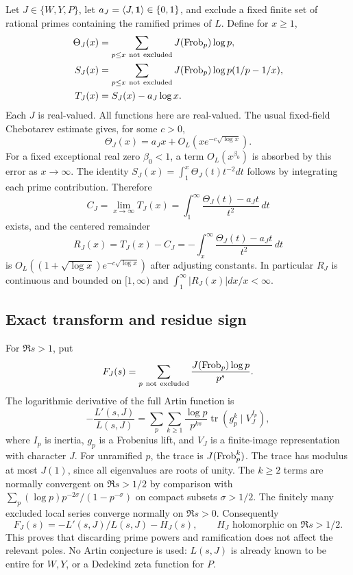 \documentclass[11pt,letterpaper]{article}
\theoremstyle{remark}\newtheorem{remark}[theorem]{Remark}
\begin{document}
Let $J\in\{W,Y,P\}$, let $a_J=\langle J,\mathbf1\rangle\in\{0,1\}$, and exclude a fixed finite set of rational primes containing the ramified primes of $L$. Define for $x\ge1$,
\begin{align*}
 \Theta_J(x)&=\sum_{p\le x\ \mathrm{not\ excluded}}J(\operatorname{Frob}_p)\log p,\\
 S_J(x)&=\sum_{p\le x\ \mathrm{not\ excluded}}J(\operatorname{Frob}_p)\log p(1/p-1/x),\\
 T_J(x)&=S_J(x)-a_J\log x.
\end{align*}
Each $J$ is real-valued. All functions here are real-valued. The usual fixed-field Chebotarev estimate gives, for some $c>0$,
\[
 \Theta_J(x)=a_J x+O_L(xe^{-c\sqrt{\log x}}).
\]
For a fixed exceptional real zero $\beta_0<1$, a term $O_L(x^{\beta_0})$ is absorbed by this error as $x\to\infty$. The identity $S_J(x)=\int_1^x\Theta_J(t)t^{-2}dt$ follows by integrating each prime contribution. Therefore
\[
 C_J=\lim_{x\to\infty}T_J(x)=\int_1^\infty\frac{\Theta_J(t)-a_Jt}{t^2}\,dt
\]
exists, and the centered remainder
\[
 R_J(x)=T_J(x)-C_J=-\int_x^\infty\frac{\Theta_J(t)-a_Jt}{t^2}\,dt
\]
is $O_L((1+\sqrt{\log x})e^{-c\sqrt{\log x}})$ after adjusting constants. In particular $R_J$ is continuous and bounded on $[1,\infty)$ and $\int_1^\infty |R_J(x)|dx/x<\infty$.

\subsection{Exact transform and residue sign}
For $\Re s>1$, put
\[
 F_J(s)=\sum_{p\ \mathrm{not\ excluded}}\frac{J(\Frob_p)\log p}{p^s}.
\]
The logarithmic derivative of the full Artin function is
\[
 -\frac{L'(s,J)}{L(s,J)}=\sum_p\sum_{k\ge1}
   \frac{\log p}{p^{ks}}\operatorname{tr}(g_p^k\mid V_J^{I_p}),
\]
where $I_p$ is inertia, $g_p$ is a Frobenius lift, and $V_J$ is a finite-image representation with character $J$. For unramified $p$, the trace is $J(\operatorname{Frob}_p^k)$. The trace has modulus at most $J(1)$, since all eigenvalues are roots of unity. The $k\ge2$ terms are normally convergent on $\Re s>1/2$ by comparison with $\sum_p (\log p)p^{-2\sigma}/(1-p^{-\sigma})$ on compact subsets $\sigma>1/2$. The finitely many excluded local series converge normally on $\Re s>0$. Consequently
\begin{equation}\label{eq:F}
 F_J(s)=-L'(s,J)/L(s,J)-H_J(s),\qquad H_J\text{ holomorphic on }\Re s>1/2.
\end{equation}
This proves that discarding prime powers and ramification does not affect the relevant poles. No Artin conjecture is used: $L(s,J)$ is already known to be entire for $W,Y$, or a Dedekind zeta function for $P$.
\end{document}
